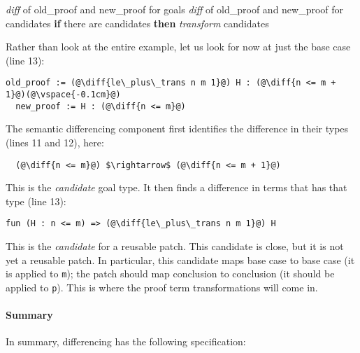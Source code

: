 \begin{algorithm}
\footnotesize
\begin{algorithmic}[1]
    \STATE \textit{diff}  of old\_proof and new\_proof for goals
    \STATE \textit{diff}  of old\_proof and new\_proof for candidates
    \STATE \textbf{if} there are candidates \textbf{then}
    \STATE \hspace*{1em} \textit{transform} candidates
\end{algorithmic}
\end{algorithm}
Rather than look at the entire example, let us look for now at just the base case (line 13):

\begin{lstlisting}[language=coq]
  old_proof := (@\diff{le\_plus\_trans n m 1}@) H : (@\diff{n <= m + 1}@)(@\vspace{-0.1cm}@)
  new_proof := H : (@\diff{n <= m}@)
\end{lstlisting}
The semantic differencing component first identifies the difference in their types (lines 11 and 12), here:

\begin{lstlisting}
  (@\diff{n <= m}@) $\rightarrow$ (@\diff{n <= m + 1}@)
\end{lstlisting}
This is the \textit{candidate} goal type.
It then finds a difference in terms that has that type (line 13):

\begin{lstlisting}[language=coq]
  fun (H : n <= m) => (@\diff{le\_plus\_trans n m 1}@) H
\end{lstlisting}
This is the \emph{candidate} for a reusable patch.
This candidate is close, but it is not yet a reusable patch. In particular, this candidate
maps base case to base case (it is applied to \lstinline{m}); the patch should map conclusion to conclusion (it should
be applied to \lstinline{p}).
This is where the proof term transformations will come in.

\paragraph{Summary}
In summary, differencing has the following specification:

